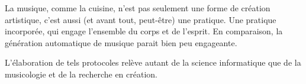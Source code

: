 La musique, comme la cuisine, n'est pas seulement une forme de création artistique, c'est aussi (et avant tout, peut-être) une pratique. Une pratique incorporée, qui engage l'ensemble du corps et de l'esprit. En comparaison, la génération automatique de musique parait bien peu engageante.





L'élaboration de tels protocoles relève autant de la science informatique que de la musicologie et de la recherche en création.








